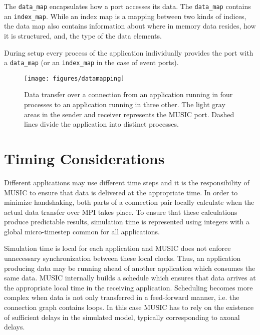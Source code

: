 \documentclass[a4paper]{report}
\begin{document}
The \lstinline|data_map| encapsulates how a port accesses its data.
The \lstinline|data_map| contains an \lstinline|index_map|.  While an
index map is a mapping between two kinds of indices, the data map also
contains information about where in memory data resides, how it is
structured, and, the type of the data elements.

During setup every process of the application individually provides
the port with a \lstinline|data_map| (or an \lstinline|index_map| in
the case of event ports).

\begin{figure}
  \begin{center}
    \texttt{[image: figures/datamapping]}
    \caption[Mapping of data]{\label{fig:datamapping}
      Data transfer over a connection from an application running in
      four processes to an application running in three other.  The
      light gray areas in the sender and receiver represents the MUSIC
      port.  Dashed lines divide the application into distinct
      processes.
    }
  \end{center}
\end{figure}

\section{Timing Considerations}
\label{sec:timing}
  
Different applications may use different time steps and it is the
responsibility of MUSIC to ensure that data is delivered at the
appropriate time.  In order to minimize handshaking, both parts of a
connection pair locally calculate when the actual data transfer over
MPI takes place.  To ensure that these calculations produce
predictable results, simulation time is represented using integers
with a global micro-timestep common for all
applications.

Simulation time is local for each application
and MUSIC does not enforce unnecessary synchronization between these
local clocks.  Thus, an application producing data may be running
ahead of another application which consumes the same data.  MUSIC
internally builds a schedule which ensures that data arrives at the
appropriate local time in the receiving application.  Scheduling
becomes more complex when data is not only transferred in a
feed-forward manner, i.e. the connection graph contains loops.  In
this case MUSIC has to rely on the existence of sufficient delays in
the simulated model, typically corresponding to axonal
delays.
\end{document}
